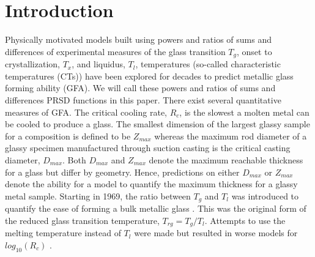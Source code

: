 \documentclass[11pt,a4paper]{article}
\begin{document}





\section{Introduction}

\par
Physically motivated models built using powers and ratios of sums and differences of experimental measures of the glass transition $T_{g}$, onset to crystallization, $T_{x}$, and liquidus, $T_{l}$, temperatures (so-called characteristic temperatures (CTs)) have been explored for decades to predict metallic glass forming ability (GFA). We will call these powers and ratios of sums and differences PRSD functions in this paper. There exist several quantitative measures of GFA. The critical cooling rate, $R_{c}$, is the slowest a molten metal can be cooled to produce a glass. The smallest dimension of the largest glassy sample for a composition is defined to be $Z_{max}$ whereas the maximum rod diameter of a glassy specimen manufactured through suction casting is the critical casting diameter, $D_{max}$. Both $D_{max}$ and $Z_{max}$ denote the maximum reachable thickness for a glass but differ by geometry. Hence, predictions on either $D_{max}$ or $Z_{max}$ denote the ability for a model to quantify the maximum thickness for a glassy metal sample. Starting in 1969, the ratio between $T_{g}$ and $T_{l}$ was introduced to quantify the ease of forming a bulk metallic glass \cite{Turnbull1969}. This was the original form of the reduced glass transition temperature, $T_{rg}=T_{g}/T_{l}$. Attempts to use the melting temperature instead of $T_{l}$ were made but resulted in worse models for $log_{10}(R_{c})$ \cite{Lu2000}.
\end{document}
